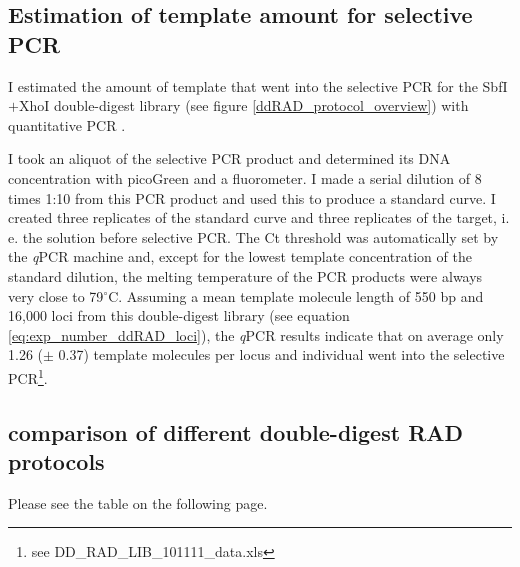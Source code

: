 \documentclass[a4paper,12pt,times,print,index,custombib,custommargin]{PhDThesisPSnPDF}\usepackage[]{graphicx}\usepackage[]{color}
\begin{document}
%
%
%

\FloatBarrier
\subsection{Estimation of template amount for selective PCR}\label{ch:qPCR}

I estimated the amount of template that went into the selective PCR for the SbfI$+$XhoI double-digest library (see figure \ref{ddRAD_protocol_overview}) with quantitative PCR \citep{Rutledge2003}.

I took an aliquot of the selective PCR product and determined its DNA concentration with picoGreen and a fluorometer. I made a serial dilution of 8 times 1:10 from this PCR product and used this to produce a standard curve. I created three replicates of the standard curve and three replicates of the target, i. e. the solution before selective PCR. The \gls{Ct} threshold was automatically set by the \textit{q}PCR machine and, except for the lowest template concentration of the standard dilution, the melting temperature of the PCR products were always very close to 79$^{\circ}$C. Assuming a mean template molecule length of 550 \gls{bp} and 16,000 loci from this double-digest library (see equation \ref{eq:exp_number_ddRAD_loci}), the \textit{q}PCR results indicate that on average only 1.26 ($\pm$ 0.37) template molecules per locus and individual went into the selective PCR\footnote{see DD\_RAD\_LIB\_101111\_data.xls}.


\FloatBarrier
\subsection{comparison of different double-digest RAD protocols}

Please see the table on the following page.\label{compProt}

\pagebreak
\end{document}
